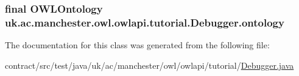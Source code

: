 \hypertarget{classuk_1_1ac_1_1manchester_1_1owl_1_1owlapi_1_1tutorial_1_1_debugger_abe5953cbf19fbd3d397e6affdbf5549d}{
\subsubsection[{ontology}]{\setlength{\rightskip}{0pt plus 5cm}final {\bf O\-W\-L\-Ontology} uk.\-ac.\-manchester.\-owl.\-owlapi.\-tutorial.\-Debugger.\-ontology\hspace{0.3cm}{\ttfamily [private]}}}\label{classuk_1_1ac_1_1manchester_1_1owl_1_1owlapi_1_1tutorial_1_1_debugger_abe5953cbf19fbd3d397e6affdbf5549d}


The documentation for this class was generated from the following file\-:\begin{DoxyCompactItemize}
\item 
contract/src/test/java/uk/ac/manchester/owl/owlapi/tutorial/\hyperlink{test_2java_2uk_2ac_2manchester_2owl_2owlapi_2tutorial_2_debugger_8java}{Debugger.\-java}\end{DoxyCompactItemize}
